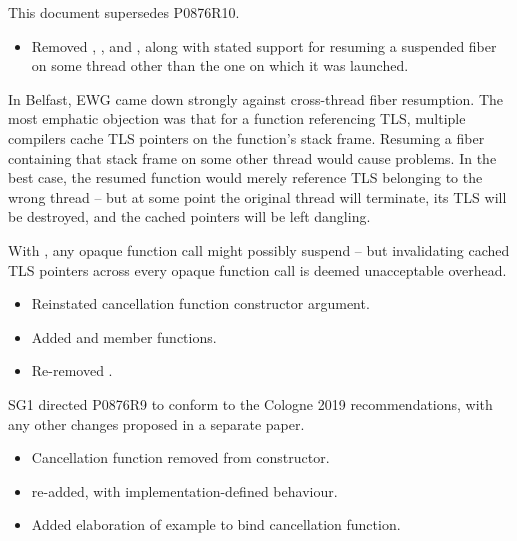 \label{history}
This document supersedes P0876R10.



\begin{itemize}
    \item Removed \xtresume, \xtresumewith, \xtcancel and \canxtresume, along
          with stated support for resuming a suspended fiber on some thread
          other than the one on which it was launched.
\end{itemize}

In Belfast, EWG came down strongly against cross-thread fiber resumption. The
most emphatic objection was that for a function referencing TLS, multiple
compilers cache TLS pointers on the function's stack frame. Resuming a fiber
containing that stack frame on some other thread would cause problems. In the
best case, the resumed function would merely reference TLS belonging to the
wrong thread -- but at some point the original thread will terminate, its TLS
will be destroyed, and the cached pointers will be left dangling.

With \fiber, any opaque function call might possibly suspend -- but
invalidating cached TLS pointers across every opaque function call is deemed
unacceptable overhead.
\newpage
{}

\begin{itemize}
    \item Reinstated cancellation function constructor argument.
    \item Added  and  member
          functions.
    \item Re-removed \unwindfib.
\end{itemize}

SG1 directed P0876R9 to conform to the Cologne 2019 recommendations, with any
other changes proposed in a separate paper.


\begin{itemize}
    \item Cancellation function removed from \fiber constructor.
    \item \unwindfib re-added, with implementation-defined behaviour.
    \item Added elaboration of  example to bind cancellation
          function.
\end{itemize}


